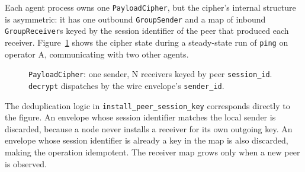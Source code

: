 \documentclass[11pt,a4paper]{article}
\begin{document}
Each agent process owns one \texttt{PayloadCipher}, but the
cipher's internal structure is asymmetric: it has one outbound
\texttt{GroupSender} and a map of inbound \texttt{GroupReceiver}s
keyed by the session identifier of the peer that produced each
receiver. Figure~\ref{fig:cipher-shape} shows the cipher state
during a steady-state run of \texttt{ping} on operator A,
communicating with two other agents.

\begin{figure}[H]
\centering
{}
\caption{\texttt{PayloadCipher}: one sender, N receivers keyed by
peer \texttt{session\_id}. \texttt{decrypt} dispatches by the wire
envelope's \texttt{sender\_id}.}
\label{fig:cipher-shape}
\end{figure}

The deduplication logic in
\texttt{install\_peer\_session\_key} corresponds directly to the
figure. An envelope whose session identifier matches the local
sender is discarded, because a node never installs a receiver
for its own outgoing key. An envelope whose session identifier
is already a key in the map is also discarded, making the
operation idempotent. The receiver map grows only when a new
peer is observed.
\end{document}
